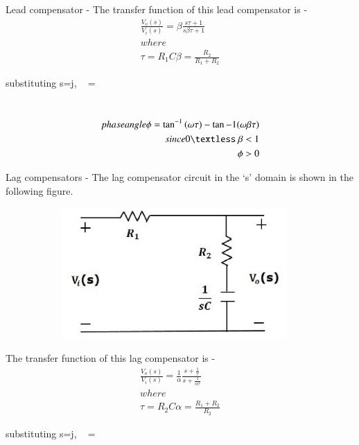 \begin{enumerate}[label=\thesection.\arabic*.,ref=\thesection.\theenumi]
Lead compensator - 
The transfer function of this lead compensator is -
\begin{align}
    \frac{V_o(s)}{V_i(s)} = \beta  \frac{s \tau +1}{s\beta \tau +1} \\
where\\
\tau = R_1C  \beta =\frac{R_2}{R_1+R_2}
\end{align}

\vspace{0.3cm}substituting s=j\omega, \  = \beta  {}

\\
\begin{align}
phase angle \phi = \tan^{-1} {(\omega\tau)} - \tan{-1}{(\omega\beta\tau)}\\
since 0 \textless \ \beta < 1\\
\phi > 0
\end{align}




Lag compensators - 
The lag compensator circuit in the ‘s’ domain is shown in the following figure.
 
\begin{figure}[h]
 
\begin{subfigure}{0.5\textwidth}
\includegraphics[width=0.9\linewidth, height=5cm ,inner]{./figs/ee18btech11027/lag_compensator.eps} 
\label{fig:subim1}
\end{subfigure}
\end{figure}

The transfer function of this lag compensator is -
\begin{align}
    \frac{V_o(s)}{V_i(s)} = \frac{1}{\alpha}  \frac{s + \frac{1}{\tau}}{s + \frac{1}{\alpha\tau}} \\
where\\
 \tau = R_2C  \alpha =\frac{R_1+R_2}{R_2}
\end{align}

substituting s=j\omega, \  =   


\end{enumerate}

